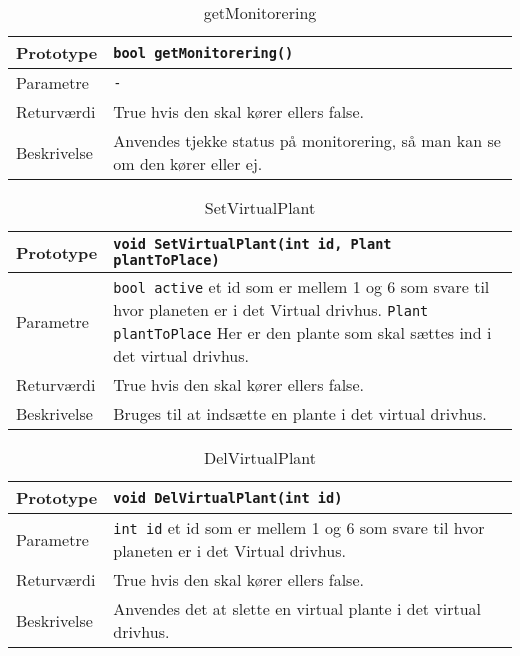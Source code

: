 \begin{table}[h]
\begin{tabularx}{\textwidth}{| >{\raggedright\arraybackslash}p{2.5 cm} | >{\raggedright\arraybackslash}X |} \hline
Prototype & \texttt{bool getMonitorering()} \\\hline
Parametre & \texttt{-} \newline
 \\\hline
Returværdi & True hvis den skal kører ellers false. \\\hline
Beskrivelse & Anvendes tjekke status på monitorering, så man kan se om den kører eller ej. \\\hline
\end{tabularx}
\caption{getMonitorering}
\label{table:getMonitorering}
\end{table}

\begin{table}[h]
\begin{tabularx}{\textwidth}{| >{\raggedright\arraybackslash}p{2.5 cm} | >{\raggedright\arraybackslash}X |} \hline
Prototype & \texttt{void SetVirtualPlant(int id, Plant plantToPlace)} \\\hline
Parametre & \texttt{bool active} \newline et id som er mellem 1 og 6 som svare til hvor planeten er i det Virtual drivhus. \newline
\texttt{Plant plantToPlace} \newline Her er den plante som skal sættes ind i det virtual drivhus. \\\hline
Returværdi & True hvis den skal kører ellers false. \\\hline
Beskrivelse & Bruges til at indsætte en plante i det virtual drivhus. \\\hline
\end{tabularx}
\caption{SetVirtualPlant}
\label{table:SetVirtualPlant}
\end{table}

\begin{table}[h]
\begin{tabularx}{\textwidth}{| >{\raggedright\arraybackslash}p{2.5 cm} | >{\raggedright\arraybackslash}X |} \hline
Prototype & \texttt{void DelVirtualPlant(int id)} \\\hline
Parametre & \texttt{int id} \newline et id som er mellem 1 og 6 som svare til hvor planeten er i det Virtual drivhus. \\\hline
Returværdi & True hvis den skal kører ellers false. \\\hline
Beskrivelse & Anvendes det at slette en virtual plante i det virtual drivhus. \\\hline
\end{tabularx}
\caption{DelVirtualPlant}
\label{table:DelVirtualPlant}
\end{table}

